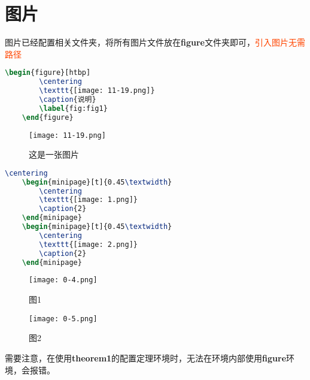 \documentclass[12pt, a4paper, oneside, UTF8]{ctexbook}
\begin{document}
\else
\fi

\chapter{图片}

图片已经配置相关文件夹，将所有图片文件放在\textbf{figure}文件夹即可，\textcolor{OrangeRed}{引入图片无需路径}

\begin{lstlisting}[language=TeX]
    \begin{figure}[htbp]
        \centering
        \texttt{[image: 11-19.png]}
        \caption{说明}
        \label{fig:fig1}
    \end{figure}
\end{lstlisting}

\begin{figure}[htbp]
    \centering
    \texttt{[image: 11-19.png]}
    \caption{这是一张图片}
    \label{fig:fig1}
\end{figure}


\begin{lstlisting}[language=TeX]
    \centering
    \begin{minipage}[t]{0.45\textwidth}
        \centering
        \texttt{[image: 1.png]}
        \caption{2}
    \end{minipage}
    \begin{minipage}[t]{0.45\textwidth}
        \centering
        \texttt{[image: 2.png]}
        \caption{2}
    \end{minipage}
\end{lstlisting}

\begin{figure}[htbp]
    \centering
    \begin{minipage}[t]{0.48\textwidth}
        \centering
        \texttt{[image: 0-4.png]}
        \caption{图1}
    \end{minipage}
    \begin{minipage}[t]{0.48\textwidth}
        \centering
        \texttt{[image: 0-5.png]}
        \caption{图2}
    \end{minipage}
\end{figure}

\begin{remark}
    需要注意，在使用\textbf{theorem1}的配置定理环境时，无法在环境内部使用\textbf{figure}环境，会报错。
\end{remark}

\ifx\allfiles\undefined
\end{document}

